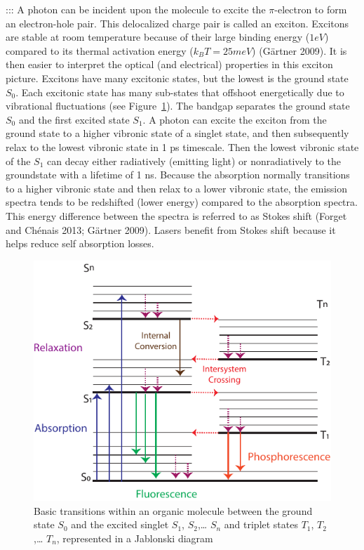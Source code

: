 \documentclass[
  letterpaper,
  DIV=11,
  numbers=noendperiod,
  oneside]{scrreprt}
\begin{document}
::: A photon can be incident upon the molecule to excite the
\(\pi\)-electron to form an electron-hole pair. This delocalized charge
pair is called an exciton. Excitons are stable at room temperature
because of their large binding energy (\(1 eV\)) compared to its thermal
activation energy (\(k_BT=25 meV\)) (Gärtner 2009). It is then easier to
interpret the optical (and electrical) properties in this exciton
picture. Excitons have many excitonic states, but the lowest is the
ground state \(S_0\). Each excitonic state has many sub-states that
offshoot energetically due to vibrational fluctuations (see
Figure~\ref{fig-absorb}). The bandgap separates the ground state \(S_0\)
and the first excited state \(S_1\). A photon can excite the exciton
from the ground state to a higher vibronic state of a singlet state, and
then subsequently relax to the lowest vibronic state in 1 ps timescale.
Then the lowest vibronic state of the \(S_1\) can decay either
radiatively (emitting light) or nonradiatively to the groundstate with a
lifetime of 1 ns. Because the absorption normally transitions to a
higher vibronic state and then relax to a lower vibronic state, the
emission spectra tends to be redshifted (lower energy) compared to the
absorption spectra. This energy difference between the spectra is
referred to as Stokes shift (Forget and Chénais 2013; Gärtner 2009).
Lasers benefit from Stokes shift because it helps reduce self absorption
losses.

\begin{figure}

{\centering \includegraphics{./images/absorb.pdf}

}

\caption{\label{fig-absorb}Basic transitions within an organic molecule
between the ground state \(S_0\) and the excited singlet \(S_1\),
\(S_2\),\ldots{} \(S_n\) and triplet states \(T_1\), \(T_2\),\ldots{}
\(T_n\), represented in a Jablonski diagram}

\end{figure}
\end{document}
